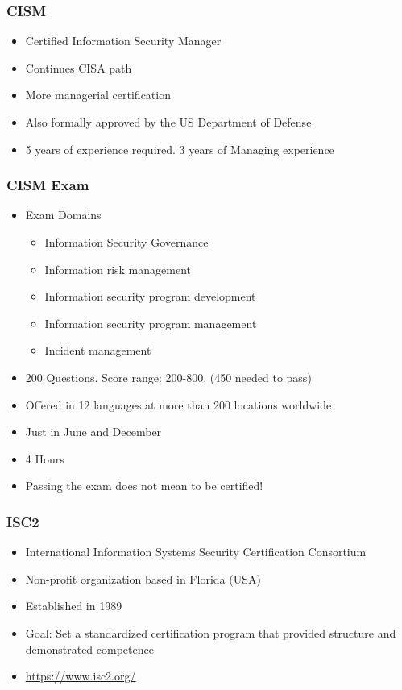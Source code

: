 \documentclass{beamer}
\begin{document}

\begin{frame}
\frametitle{CISM}
\begin{itemize}
\item Certified Information Security Manager
\item Continues CISA path
\item More managerial certification
\item Also formally approved by the US Department of Defense
\item 5 years of experience required. 3 years of Managing experience
\end{itemize}
\end{frame}



\begin{frame}
\frametitle{CISM Exam}
\begin{itemize}
\item Exam Domains
\begin{itemize}
    \item Information Security Governance
    \item Information risk management
    \item Information security program development
    \item Information security program management
    \item Incident management
\end{itemize}
\item 200 Questions. Score range: 200-800. (450 needed to pass)
\item Offered in 12 languages at more than 200 locations worldwide
\item Just in June and December
\item 4 Hours
\item Passing the exam does not mean to be certified!
\end{itemize}
\end{frame}


\begin{frame}
\frametitle{ISC2}
\begin{itemize}
\item International Information Systems Security Certification Consortium
\item Non-profit organization based in Florida (USA)
\item Established in 1989
\item Goal: Set a standardized certification program that provided structure and demonstrated competence
\item \url{https://www.isc2.org/}
\end{itemize}
\end{frame}
\end{document}
